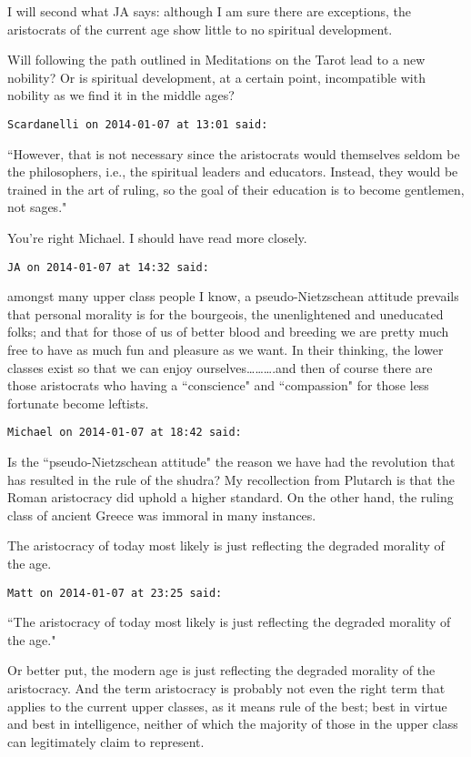 \begin{footnotesize}
\begin{sffamily}
I will second what JA says: although I am sure there are exceptions, the aristocrats of the current age show little to no spiritual development.

Will following the path outlined in Meditations on the Tarot lead to a new nobility? Or is spiritual development, at a certain point, incompatible with nobility as we find it in the middle ages?


\hfill

\texttt{Scardanelli on 2014-01-07 at 13:01 said: }

``However, that is not necessary since the aristocrats would themselves seldom be the philosophers, i.e., the spiritual leaders and educators. Instead, they would be trained in the art of ruling, so the goal of their education is to become gentlemen, not sages."

You're right Michael. I should have read more closely.


\hfill

\texttt{JA on 2014-01-07 at 14:32 said: }

amongst many upper class people I know, a pseudo-Nietzschean attitude prevails that personal morality is for the bourgeois, the unenlightened and uneducated folks; and that for those of us of better blood and breeding we are pretty much free to have as much fun and pleasure as we want. In their thinking, the lower classes exist so that we can enjoy ourselves……….and then of course there are those aristocrats who having a ``conscience" and ``compassion" for those less fortunate become leftists.


\hfill

\texttt{Michael on 2014-01-07 at 18:42 said: }

Is the ``pseudo-Nietzschean attitude" the reason we have had the revolution that has resulted in the rule of the shudra? My recollection from Plutarch is that the Roman aristocracy did uphold a higher standard. On the other hand, the ruling class of ancient Greece was immoral in many instances.

The aristocracy of today most likely is just reflecting the degraded morality of the age.


\hfill

\texttt{Matt on 2014-01-07 at 23:25 said: }

``The aristocracy of today most likely is just reflecting the degraded morality of the age."

Or better put, the modern age is just reflecting the degraded morality of the aristocracy. And the term aristocracy is probably not even the right term that applies to the current upper classes, as it means rule of the best; best in virtue and best in intelligence, neither of which the majority of those in the upper class can legitimately claim to represent.



\end{sffamily}
\end{footnotesize}
